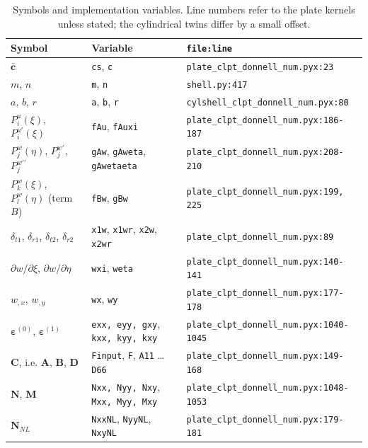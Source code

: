 \begin{table}[!htbp]
	\centering
	\caption[]{Symbols and implementation variables. Line numbers refer to the plate kernels unless stated; the cylindrical twins differ by a small offset.}
	\label{tab:tangent-donnell-code}
	\renewcommand{\arraystretch}{1.3}
	\setlength{\tabcolsep}{4pt}
	\begin{tabular}{lll}
		\toprule
		Symbol & Variable & \texttt{file:line} \\
		\midrule
		$\bar{\boldsymbol{c}}$ & \texttt{cs}, \texttt{c} & \texttt{plate\_clpt\_donnell\_num.pyx:23} \\
		$m$, $n$ & \texttt{m}, \texttt{n} & \texttt{shell.py:417} \\
		$a$, $b$, $r$ & \texttt{a}, \texttt{b}, \texttt{r} & \texttt{cylshell\_clpt\_donnell\_num.pyx:80} \\
		$P_i^u(\xi)$, $P_i^{u\prime}(\xi)$ & \texttt{fAu}, \texttt{fAuxi} & \texttt{plate\_clpt\_donnell\_num.pyx:186-187} \\
		$P_j^w(\eta)$, $P_j^{w\prime}$, $P_j^{w\prime\prime}$ & \texttt{gAw}, \texttt{gAweta}, \texttt{gAwetaeta} & \texttt{plate\_clpt\_donnell\_num.pyx:208-210} \\
		$P_k^w(\xi)$, $P_l^w(\eta)$ (term $B$) & \texttt{fBw}, \texttt{gBw} & \texttt{plate\_clpt\_donnell\_num.pyx:199, 225} \\
		$\delta_{t1}$, $\delta_{r1}$, $\delta_{t2}$, $\delta_{r2}$ & \texttt{x1w}, \texttt{x1wr}, \texttt{x2w}, \texttt{x2wr} & \texttt{plate\_clpt\_donnell\_num.pyx:89} \\
		$\partial w/\partial\xi$, $\partial w/\partial\eta$ & \texttt{wxi}, \texttt{weta} & \texttt{plate\_clpt\_donnell\_num.pyx:140-141} \\
		$w_{,x}$, $w_{,y}$ & \texttt{wx}, \texttt{wy} & \texttt{plate\_clpt\_donnell\_num.pyx:177-178} \\
		$\boldsymbol{\varepsilon}^{(0)}$, $\boldsymbol{\varepsilon}^{(1)}$ & \texttt{exx, eyy, gxy}, \texttt{kxx, kyy, kxy} & \texttt{plate\_clpt\_donnell\_num.pyx:1040-1045} \\
		$\boldsymbol{C}$, i.e. $\boldsymbol{A}$, $\boldsymbol{B}$, $\boldsymbol{D}$ & \texttt{Finput}, \texttt{F}, \texttt{A11} \ldots \texttt{D66} & \texttt{plate\_clpt\_donnell\_num.pyx:149-168} \\
		$\boldsymbol{N}$, $\boldsymbol{M}$ & \texttt{Nxx, Nyy, Nxy}, \texttt{Mxx, Myy, Mxy} & \texttt{plate\_clpt\_donnell\_num.pyx:1048-1053} \\
		$\boldsymbol{N}_{NL}$ & \texttt{NxxNL}, \texttt{NyyNL}, \texttt{NxyNL} & \texttt{plate\_clpt\_donnell\_num.pyx:179-181} \\

\end{tabular}
\end{table}
